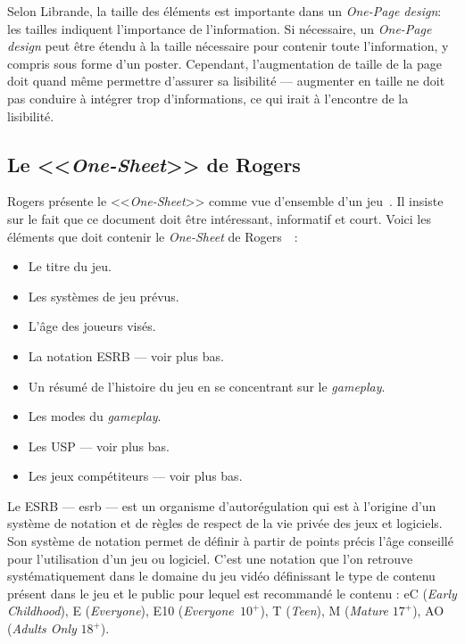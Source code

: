 Selon Librande, la taille des éléments est importante dans un \emph{One-Page design}: les tailles indiquent l'importance de l'information.
Si nécessaire, un \emph{One-Page design} peut être étendu à la taille nécessaire pour contenir toute l'information, y compris sous forme d'un poster.
Cependant, l'augmentation de taille de la page doit quand même permettre d'assurer sa lisibilité --- augmenter en taille ne doit pas conduire à intégrer trop d'informations, ce qui irait à l'encontre de la lisibilité.


\subsection{Le <<\emph{One-Sheet}>> de Rogers}



Rogers présente le <<\emph{One-Sheet}>> comme vue d'ensemble d'un jeu~\cite{LevelUpRogers2014}.
Il insiste sur le fait que ce document doit être intéressant, informatif et court.
Voici les éléments que doit contenir le \emph{One-Sheet} de Rogers~\cite{LevelUpRogers2014}~: 
\begin{itemize}
    \item Le titre du jeu.
    \item Les systèmes de jeu prévus.
    \item L'\^age des joueurs visés.
    \item La notation ESRB --- voir plus bas.
    \item Un résumé de l'histoire du jeu en se concentrant sur le \emph{gameplay}.
    \item Les modes du \emph{gameplay}.
    \item Les USP --- voir plus bas.
    \item Les jeux compétiteurs --- voir plus bas.
\end{itemize}


Le ESRB --- \gls{esrb} --- est un organisme d'autorégulation qui est à l'origine d'un système de notation et de règles de respect de la vie privée des jeux et logiciels.
Son système de notation permet de définir à partir de points précis l'âge conseillé pour l'utilisation d'un jeu ou logiciel.
C'est une notation que l'on retrouve systématiquement dans le domaine du jeu vidéo définissant le type de contenu présent dans le jeu et le public pour lequel est recommandé le contenu : eC (\emph{Early Childhood}), E (\emph{Everyone}), E10 (\emph{Everyone~$10^+$}), T (\emph{Teen}), M (\emph{Mature} $17^+$), AO (\emph{Adults Only} $18^+$).


